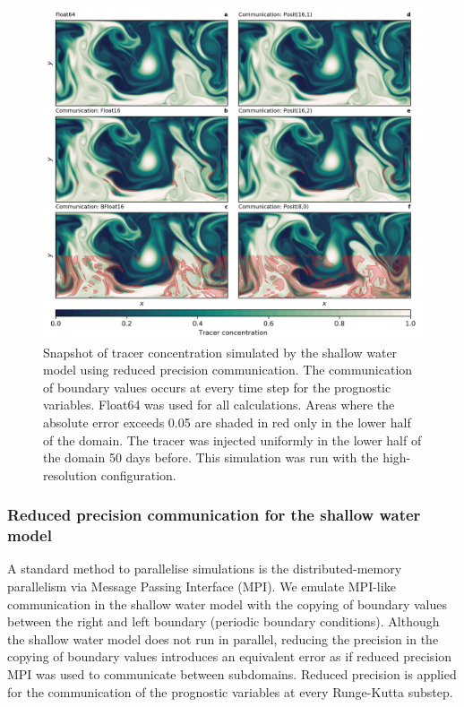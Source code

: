 \documentclass[draft]{agujournal2019}
\begin{document}
\begin{figure}
\includegraphics[width=1\textwidth]{snapshot_comm.png}
\caption{Snapshot of tracer concentration simulated by the shallow water model using reduced precision communication. The communication of boundary values occurs at every time step for the prognostic variables. Float64 was used for all calculations. Areas where the absolute error exceeds 0.05 are shaded in red only in the lower half of the domain. The tracer was injected uniformly in the lower half of the domain 50 days before. This simulation was run with the high-resolution configuration.}
\label{fig:snapshot_comm}
\end{figure}


\subsubsection{Reduced precision communication for the shallow water model}
\label{sec:comm}

A standard method to parallelise simulations is the distributed-memory parallelism via Message Passing Interface (MPI). We emulate MPI-like communication in the shallow water model with the copying of boundary values between the right and left boundary (periodic boundary conditions). Although the shallow water model does not run in parallel, reducing the precision in the copying of boundary values introduces an equivalent error as if reduced precision MPI was used to communicate between subdomains. Reduced precision is applied for the communication of the prognostic variables at every Runge-Kutta substep.
\end{document}

